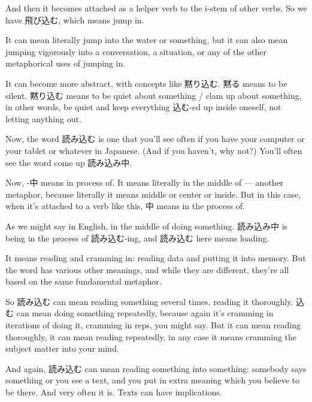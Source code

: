 And then it becomes attached as a helper verb to the i-stem of other verbs. So we have 飛び込む, which means jump in.

{}

It can mean literally jump into the water or something, but it can also mean jumping vigorously into a conversation, a situation, or any of the other metaphorical uses of jumping in.

\stopsectionlevel

\startsectionlevel[title={黙り込む},reference={黙り込む}]

It can become more abstract, with concepts like 黙り込む. 黙る means to be silent. 黙り込む means to be quiet about something / clam up about something, in other words, be quiet and keep everything 込む-ed up inside oneself, not letting anything out.

\stopsectionlevel

\startsectionlevel[title={読み込む},reference={読み込む}]

Now, the word 読み込む is one that you'll see often if you have your computer or your tablet or whatever in Japanese. (And if you haven't, why not?) You'll often see the word come up 読み込み中.

Now, -中 means in process of. It means literally in the middle of --- another metaphor, because literally it means middle or center or inside. But in this case, when it's attached to a verb like this, 中 means in the process of.

As we might say in English, in the middle of doing something. 読み込み中 is being in the process of 読み込む-ing, and 読み込む here means loading.

It means reading and cramming in: reading data and putting it into memory. But the word has various other meanings, and while they are different, they're all based on the same fundamental metaphor.

So 読み込む can mean reading something several times, reading it thoroughly. 込む can mean doing something repeatedly, because again it's cramming in iterations of doing it, cramming in reps, you might say. But it can mean reading thoroughly, it can mean reading repeatedly, in any case it means cramming the subject matter into your mind.

And again, 読み込む can mean reading something into something: somebody says something or you see a text, and you put in extra meaning which you believe to be there. And very often it is. Texts can have implications.

